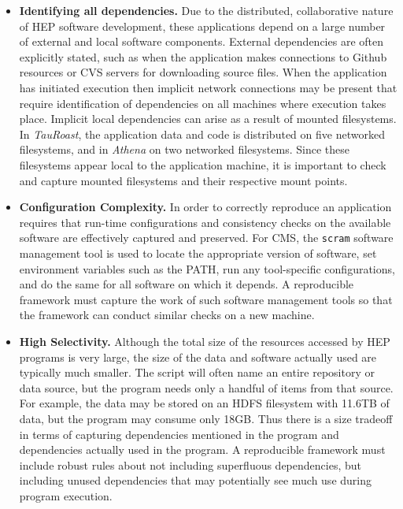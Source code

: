 \begin{itemize}

\item {\bf Identifying all dependencies.}  Due to the distributed, collaborative nature of HEP software development, these applications depend on a large number of external and local software components.
External dependencies are often explicitly stated, such as when the application makes connections to Github resources or CVS servers for downloading source files. 
When the application has initiated execution then implicit network connections may be present that require identification of dependencies on all machines where execution takes place. 
Implicit local dependencies can arise as a result of mounted filesystems. In \emph{TauRoast}, the application data and code is distributed on five networked filesystems, and in \emph{Athena} on two networked filesystems. 
Since these filesystems appear local to the application machine, it is important to check and capture mounted filesystems and their respective mount points. 

\item {\bf Configuration Complexity.} In order to correctly reproduce an application requires that run-time configurations and consistency checks on the available software are effectively captured and preserved. 
For CMS,  the {\tt scram} software management tool is used to locate
the appropriate version of software,  set environment variables such as the PATH, run any
tool-specific configurations, and do the same for all software on which it depends. A reproducible framework must capture the work of such software management tools so that the framework can conduct similar checks on a new machine. 

\item {\bf High Selectivity.}  
Although the total size of the resources accessed by HEP programs is very large, the size of the data and software actually used are typically much smaller. The script will often name an entire repository or data source, but the program needs only a handful of items from that source. For example, the data may be stored on an HDFS filesystem with 11.6TB of data, but the program may consume only 18GB. Thus there is a size tradeoff in terms of capturing dependencies mentioned in the program and dependencies actually used in the program. A reproducible framework must include robust rules about not including superfluous dependencies, but including unused dependencies that may potentially see much use during program execution.


\end{itemize}
